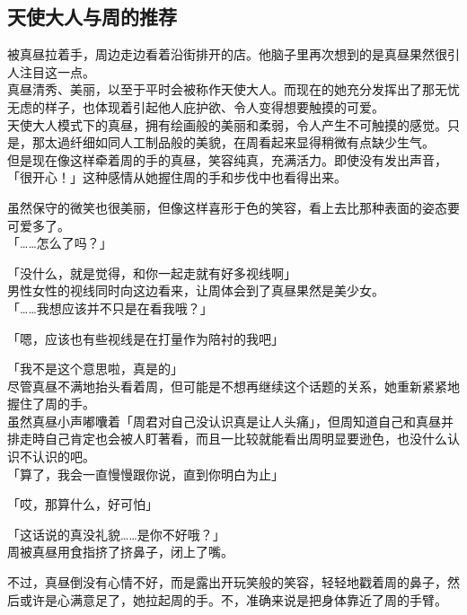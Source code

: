 \subsection{天使大人与周的推荐}

被真昼拉着手，周边走边看着沿街排开的店。他脑子里再次想到的是真昼果然很引人注目这一点。\\

真昼清秀、美丽，以至于平时会被称作天使大人。而现在的她充分发挥出了那无忧无虑的样子，也体现着引起他人庇护欲、令人变得想要触摸的可爱。\\%

天使大人模式下的真昼，拥有绘画般的美丽和柔弱，令人产生不可触摸的感觉。只是，那太過纤细如同人工制品般的美貌，在周看起来显得稍微有点缺少生气。\\

但是现在像这样牵着周的手的真昼，笑容纯真，充满活力。即使没有发出声音，「很开心！」这种感情从她握住周的手和步伐中也看得出来。

虽然保守的微笑也很美丽，但像这样喜形于色的笑容，看上去比那种表面的姿态要可爱多了。\\

「……怎么了吗？」

「没什么，就是觉得，和你一起走就有好多视线啊」\\

男性女性的视线同时向这边看来，让周体会到了真昼果然是美少女。\\

「……我想应该并不只是在看我哦？」

「嗯，应该也有些视线是在打量作为陪衬的我吧」

「我不是这个意思啦，真是的」\\

尽管真昼不满地抬头看着周，但可能是不想再继续这个话题的关系，她重新紧紧地握住了周的手。\\

虽然真昼小声嘟囔着「周君对自己没认识真是让人头痛」，但周知道自己和真昼并排走時自己肯定也会被人盯著看，而且一比较就能看出周明显要逊色，也没什么认识不认识的吧。\\

「算了，我会一直慢慢跟你说，直到你明白为止」

「哎，那算什么，好可怕」

「这话说的真没礼貌……是你不好哦？」\\

周被真昼用食指挤了挤鼻子，闭上了嘴。

不过，真昼倒没有心情不好，而是露出开玩笑般的笑容，轻轻地戳着周的鼻子，然后或许是心满意足了，她拉起周的手。不，准确来说是把身体靠近了周的手臂。\\

